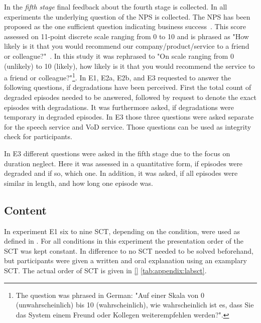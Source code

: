 In the \emph{fifth stage} final feedback about the fourth stage is collected.
In all experiments the underlying question of the \ac{NPS} is collected.
The \ac{NPS} has been proposed as the one sufficient question indicating business success~\citep[\cf,][]{reichheld_one_2003}.
This score assessed on 11-point discrete scale ranging from 0 to 10 and is phrased as "How likely is it that you would recommend our company/product/service to a friend or colleague?"~\citep[][p. 5]{reichheld_one_2003}.
In this study it was rephrased to "On scale ranging from 0 (unlikely) to 10 (likely), how likely is it that you would recommend the service to a friend or colleague?"\footnote{The question was phrased in German: "Auf einer Skala von 0 (unwahrscheinlich) bis 10 (wahrscheinlich), wie wahrscheinlich ist es, dass Sie das System einem Freund oder Kollegen weiterempfehlen werden?".}.
In E1, E2a, E2b, and E3 requested to answer the following questions, if degradations have been perceived.
First the total count of degraded episodes needed to be answered, followed by request to denote the exact episodes with degradations.
It was furthermore asked, if degradations were temporary in degraded episodes. 
In E3 those three questions were asked separate for the speech service and \ac{VoD} service.
Those questions can be used as integrity check for participants.

In E3 different questions were asked in the fifth stage due to the focus on duration neglect.
Here it was assessed in a quantitative form, if episodes were degraded and if so, which one.
In addition, it was asked, if all episodes were similar in length, and how long one episode was.

\subsection{Content}
In experiment E1 six to nine \acs{SCT}, depending on the condition, were used as defined in \cite{itu-t_p.805:_2007}.
For all conditions in this experiment the presentation order of the \acs{SCT} was kept constant.
In difference to \cite{itu-t_p.805:_2007} no \ac{SCT} needed to be solved beforehand, but participants were given a written and oral explanation using an examplary \ac{SCT}.
The actual order of \acs{SCT} is given in \autoref{} \autoref{tab:appendix:labsct}.

